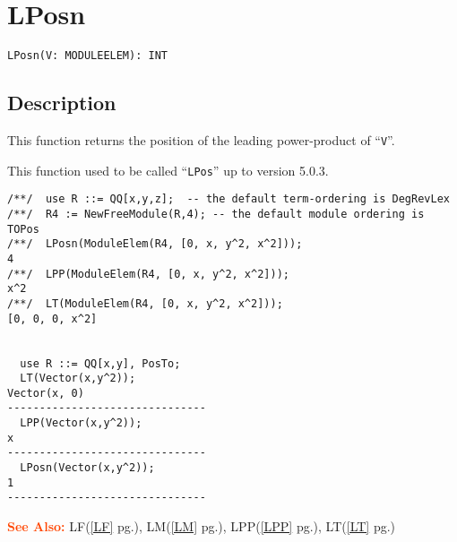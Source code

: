 \documentclass[a4paper]{mybook}
\newenvironment{command}{}{} %
\newcommand\SeeAlso{\par\textcolor{OrangeRed}{\textbf{\large See Also: }}}
\begin{document}
\section{LPosn}
\label{LPosn}
\begin{command} %


\begin{Verbatim}[label=syntax, rulecolor=\color{MidnightBlue},
frame=single]
LPosn(V: MODULEELEM): INT
\end{Verbatim}


\subsection*{Description}

This function returns the position of the leading power-product of ``\verb&V&''.
\par 
This function used to be called ``\verb&LPos&'' up to version 5.0.3.
\begin{Verbatim}[label=example, rulecolor=\color{PineGreen}, frame=single]
/**/  use R ::= QQ[x,y,z];  -- the default term-ordering is DegRevLex
/**/  R4 := NewFreeModule(R,4); -- the default module ordering is TOPos
/**/  LPosn(ModuleElem(R4, [0, x, y^2, x^2]));
4
/**/  LPP(ModuleElem(R4, [0, x, y^2, x^2]));
x^2
/**/  LT(ModuleElem(R4, [0, x, y^2, x^2]));
[0, 0, 0, x^2]


  use R ::= QQ[x,y], PosTo;
  LT(Vector(x,y^2));
Vector(x, 0)
-------------------------------
  LPP(Vector(x,y^2));
x
-------------------------------
  LPosn(Vector(x,y^2));
1
-------------------------------
\end{Verbatim}


\SeeAlso %
  LF(\ref{LF} pg.\pageref{LF}), 
    LM(\ref{LM} pg.\pageref{LM}), 
    LPP(\ref{LPP} pg.\pageref{LPP}), 
    LT(\ref{LT} pg.\pageref{LT})
\end{command} %
\end{document}
